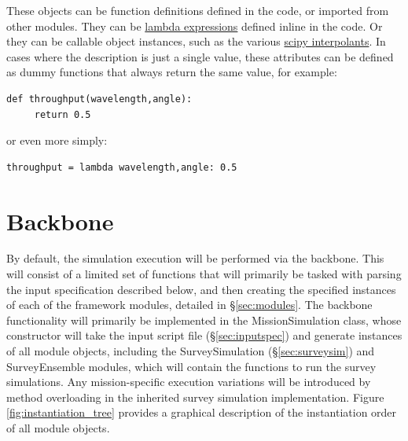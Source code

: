 \documentclass[cleanfoot]{asme2ej}
\newcommand{\reffig}[1]{Figure \ref{#1}}
\begin{document}
These objects can be function definitions defined in the code, or imported from other modules.  They can be \href{https://docs.python.org/2/reference/expressions.html#lambda}{lambda expressions} defined inline in the code.  Or they can be callable object instances, such as the various \href{http://docs.scipy.org/doc/scipy/reference/interpolate.html}{scipy interpolants}.  In cases where the description is just a single value, these attributes can be defined as dummy functions that always return the same value, for example:
\begin{verbatim}
def throughput(wavelength,angle):
     return 0.5
\end{verbatim}
or even more simply:
\begin{verbatim}
throughput = lambda wavelength,angle: 0.5
\end{verbatim}

\section{Backbone}
By default, the simulation execution will be performed via the backbone.  This will consist of a limited set of functions that will primarily be tasked with parsing the input specification described below, and then creating the specified instances of each of the framework modules, detailed in \S\ref{sec:modules}.  The backbone functionality will primarily be implemented in the MissionSimulation class, whose constructor will take the input script file (\S\ref{sec:inputspec}) and generate instances of all module objects, including the SurveySimulation (\S\ref{sec:surveysim}) and SurveyEnsemble modules, which will contain the functions to run the survey simulations. Any mission-specific execution variations will be introduced by method overloading in the inherited survey simulation implementation. \reffig{fig:instantiation_tree} provides a graphical description of the instantiation order of all module objects.
\end{document}
